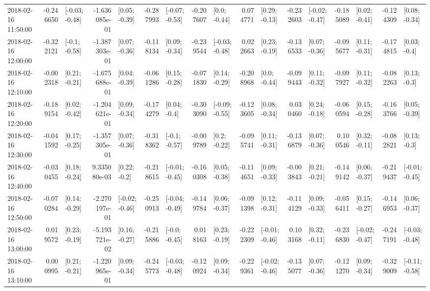 \begin{tabular}{lrlrlrlrlrlrlrlrl}
2018-02-16 11:50:00 & -0.246650 &  [-0.03; -0.48] & -1.636085e-01 &   [0.05; -0.39] & -0.287993 &  [-0.07; -0.53] & -0.207607 &    [0.0; -0.44] &  0.074771 &   [0.29; -0.13] & -0.232603 &  [-0.02; -0.47] & -0.185089 &   [0.02; -0.41] & -0.124309 &   [0.08; -0.34] \\
2018-02-16 12:00:00 & -0.322121 &   [-0.1; -0.58] & -1.387303e-01 &   [0.07; -0.36] & -0.118134 &   [0.09; -0.34] & -0.239544 &  [-0.03; -0.48] &  0.022663 &   [0.23; -0.19] & -0.136533 &   [0.07; -0.36] & -0.095677 &   [0.11; -0.31] & -0.174815 &    [0.03; -0.4] \\
2018-02-16 12:10:00 & -0.002318 &   [0.21; -0.21] & -1.675688e-01 &   [0.04; -0.39] & -0.061286 &   [0.15; -0.28] & -0.071830 &   [0.14; -0.29] & -0.208968 &    [0.0; -0.44] & -0.099443 &   [0.11; -0.32] & -0.097927 &   [0.11; -0.32] & -0.082263 &    [0.13; -0.3] \\
2018-02-16 12:20:00 & -0.189154 &   [0.02; -0.42] & -1.204621e-01 &   [0.09; -0.34] & -0.174279 &    [0.04; -0.4] & -0.303090 &  [-0.09; -0.55] & -0.123605 &   [0.08; -0.34] &  0.030460 &   [0.24; -0.18] & -0.060594 &   [0.15; -0.28] & -0.163766 &   [0.05; -0.39] \\
2018-02-16 12:30:00 & -0.041592 &   [0.17; -0.25] & -1.357305e-01 &   [0.07; -0.36] & -0.318362 &   [-0.1; -0.57] & -0.009789 &    [0.2; -0.22] & -0.095741 &   [0.11; -0.31] & -0.136879 &   [0.07; -0.36] &  0.100546 &   [0.32; -0.11] & -0.082821 &    [0.13; -0.3] \\
2018-02-16 12:40:00 & -0.030455 &   [0.18; -0.24] &  9.335080e-03 &    [0.22; -0.2] & -0.218615 &  [-0.01; -0.45] & -0.160308 &   [0.05; -0.38] & -0.114651 &   [0.09; -0.33] & -0.003843 &   [0.21; -0.21] & -0.149142 &   [0.06; -0.37] & -0.219437 &  [-0.01; -0.45] \\
2018-02-16 12:50:00 & -0.070284 &   [0.14; -0.29] & -2.270197e-01 &  [-0.02; -0.46] & -0.250913 &  [-0.04; -0.49] & -0.149784 &   [0.06; -0.37] & -0.091398 &   [0.12; -0.31] & -0.114129 &   [0.09; -0.33] & -0.056411 &   [0.15; -0.27] & -0.146953 &   [0.06; -0.37] \\
2018-02-16 13:00:00 &  0.019572 &   [0.23; -0.19] & -5.193721e-02 &   [0.16; -0.27] & -0.215886 &   [-0.0; -0.45] &  0.018163 &   [0.23; -0.19] & -0.222309 &  [-0.01; -0.46] &  0.103168 &   [0.32; -0.11] & -0.236830 &  [-0.02; -0.47] & -0.247191 &  [-0.03; -0.48] \\
2018-02-16 13:10:00 &  0.000995 &   [0.21; -0.21] & -1.220965e-01 &   [0.09; -0.34] & -0.245773 &  [-0.03; -0.48] & -0.120924 &   [0.09; -0.34] & -0.229361 &  [-0.02; -0.46] & -0.135077 &   [0.07; -0.36] & -0.121270 &   [0.09; -0.34] & -0.329009 &  [-0.11; -0.58] \\

\end{tabular}

